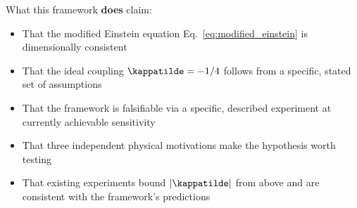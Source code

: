 \noindent What this framework \textbf{does} claim:
\begin{itemize}
    \item[$\checkmark$] That the modified Einstein equation
    Eq.~\eqref{eq:modified_einstein} is dimensionally consistent
    \item[$\checkmark$] That the ideal coupling $\kappatilde = -1/4$
    follows from a specific, stated set of assumptions
    \item[$\checkmark$] That the framework is falsifiable via a specific,
    described experiment at currently achievable sensitivity
    \item[$\checkmark$] That three independent physical motivations
    make the hypothesis worth testing
    \item[$\checkmark$] That existing experiments bound $|\kappatilde|$
    from above and are consistent with the framework's predictions
\end{itemize}
